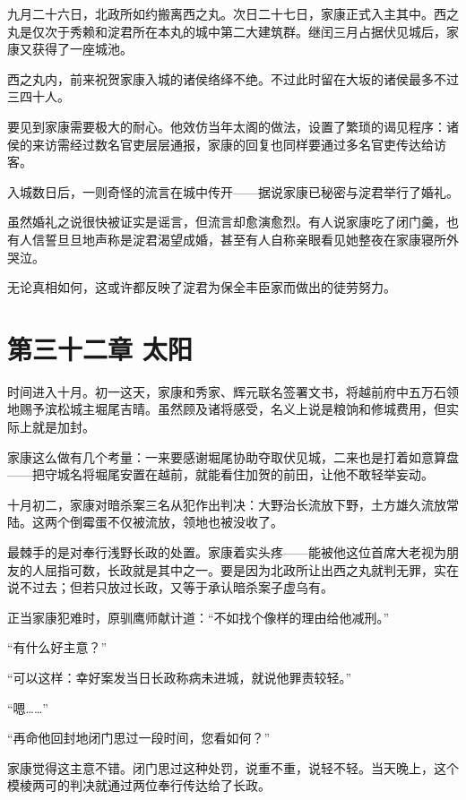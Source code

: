 \documentclass[
]{book}
\begin{document}
九月二十六日，北政所如约搬离西之丸。次日二十七日，家康正式入主其中。西之丸是仅次于秀赖和淀君所在本丸的城中第二大建筑群。继闰三月占据伏见城后，家康又获得了一座城池。

西之丸内，前来祝贺家康入城的诸侯络绎不绝。不过此时留在大坂的诸侯最多不过三四十人。

要见到家康需要极大的耐心。他效仿当年太阁的做法，设置了繁琐的谒见程序：诸侯的来访需经过数名官吏层层通报，家康的回复也同样要通过多名官吏传达给访客。

入城数日后，一则奇怪的流言在城中传开------据说家康已秘密与淀君举行了婚礼。

虽然婚礼之说很快被证实是谣言，但流言却愈演愈烈。有人说家康吃了闭门羹，也有人信誓旦旦地声称是淀君渴望成婚，甚至有人自称亲眼看见她整夜在家康寝所外哭泣。

无论真相如何，这或许都反映了淀君为保全丰臣家而做出的徒劳努力。

\chapter*{第三十二章 太阳}\label{ux7b2cux4e09ux5341ux4e8cux7ae0-ux592aux9633}

时间进入十月。初一这天，家康和秀家、辉元联名签署文书，将越前府中五万石领地赐予滨松城主堀尾吉晴。虽然顾及诸将感受，名义上说是粮饷和修城费用，但实际上就是加封。

家康这么做有几个考量：一来要感谢堀尾协助夺取伏见城，二来也是打着如意算盘------把守城名将堀尾安置在越前，就能看住加贺的前田，让他不敢轻举妄动。

十月初二，家康对暗杀案三名从犯作出判决：大野治长流放下野，土方雄久流放常陆。这两个倒霉蛋不仅被流放，领地也被没收了。

最棘手的是对奉行浅野长政的处置。家康着实头疼------能被他这位首席大老视为朋友的人屈指可数，长政就是其中之一。要是因为北政所让出西之丸就判无罪，实在说不过去；但若只放过长政，又等于承认暗杀案子虚乌有。

正当家康犯难时，原驯鹰师献计道：``不如找个像样的理由给他减刑。''

``有什么好主意？''

``可以这样：幸好案发当日长政称病未进城，就说他罪责较轻。''

``嗯\ldots\ldots{}''

``再命他回封地闭门思过一段时间，您看如何？''

家康觉得这主意不错。闭门思过这种处罚，说重不重，说轻不轻。当天晚上，这个模棱两可的判决就通过两位奉行传达给了长政。
\end{document}
